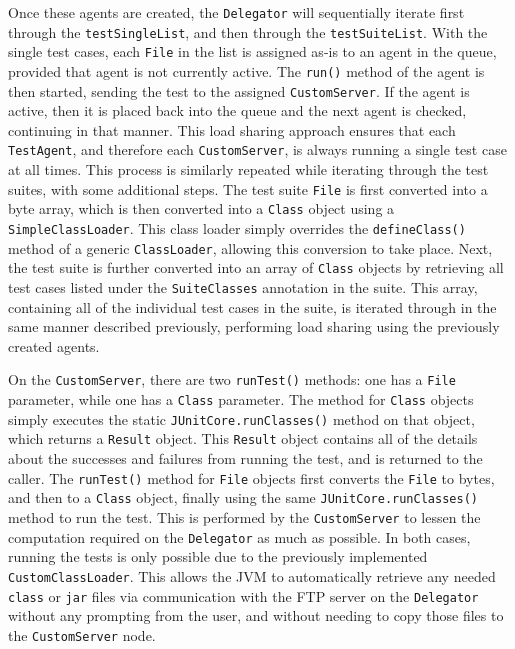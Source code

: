 \documentclass{article}
\begin{document}
{Once these agents are created, the \texttt{Delegator} will sequentially iterate first through the \texttt{testSingleList}, and then through the \texttt{testSuiteList}.  With the single test cases, each \texttt{File} in the list is assigned as-is to an agent in the queue, provided that agent is not currently active.  The \texttt{run()} method of the agent is then started, sending the test to the assigned \texttt{CustomServer}.  If the agent is active, then it is placed back into the queue and the next agent is checked, continuing in that manner.  This load sharing approach ensures that each \texttt{TestAgent}, and therefore each \texttt{CustomServer}, is always running a single test case at all times.  This process is similarly repeated while iterating through the test suites, with some additional steps.  The test suite \texttt{File} is first converted into a byte array, which is then converted into a \texttt{Class} object using a \texttt{SimpleClassLoader}.  This class loader simply overrides the \texttt{defineClass()} method of a generic \texttt{ClassLoader}, allowing this conversion to take place.  Next, the test suite is further converted into an array of \texttt{Class} objects by retrieving all test cases listed under the \texttt{SuiteClasses} annotation in the suite.  This array, containing all of the individual test cases in the suite, is iterated through in the same manner described previously, performing load sharing using the previously created agents.

On the \texttt{CustomServer}, there are two \texttt{runTest()} methods: one has a \texttt{File} parameter, while one has a \texttt{Class} parameter.  The method for \texttt{Class} objects simply executes the static \texttt{JUnitCore.runClasses()} method on that object, which returns a \texttt{Result} object.  This \texttt{Result} object contains all of the details about the successes and failures from running the test, and is returned to the caller.  The \texttt{runTest()} method for \texttt{File} objects first converts the \texttt{File} to bytes, and then to a \texttt{Class} object, finally using the same \texttt{JUnitCore.runClasses()} method to run the test.  This is performed by the \texttt{CustomServer} to lessen the computation required on the \texttt{Delegator} as much as possible.  In both cases, running the tests is only possible due to the previously implemented \texttt{CustomClassLoader}.  This allows the JVM to automatically retrieve any needed \texttt{class} or \texttt{jar} files via communication with the FTP server on the \texttt{Delegator} without any prompting from the user, and without needing to copy those files to the \texttt{CustomServer} node.

}
\end{document}
